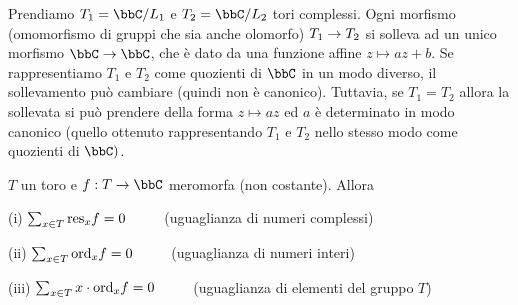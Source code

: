 
Prendiamo $T_1=\bbC/L_1$ e $T_2=\bbC/L_2$ tori complessi.
Ogni morfismo (omomorfismo di gruppi che sia anche olomorfo) $T_1\rightarrow T_2$ si solleva ad un unico morfismo $\bbC\rar\bbC$, che è dato da una funzione affine $z \mapsto az + b$.
Se rappresentiamo $T_1$ e $T_2$ come quozienti di $\bbC$ in un modo diverso, il sollevamento può cambiare (quindi non è canonico).
Tuttavia, se $T_1=T_2$ allora la sollevata si può prendere della forma $z \mapsto az$ ed $a$ è determinato in modo canonico (quello ottenuto rappresentando $T_1$ e $T_2$ nello stesso modo come quozienti di $\bbC)$.

\begin{teorema}
  \label{residui-funzioni-toriche}
$T$ un toro e $f:T\rar\bbC$ meromorfa (non costante). Allora

(i) $\sum_{x\in T}\text{res}_xf=0$ $\qquad$ (uguaglianza di numeri complessi)

(ii) $\sum_{x\in T}\text{ord}_xf=0$ $\qquad$ (uguaglianza di numeri interi)

(iii) $\sum_{x\in T}x\cdot\text{ord}_xf=0$ $\qquad$ (uguaglianza di elementi del gruppo $T$)
\end{teorema}



